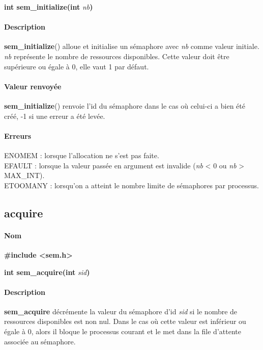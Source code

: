 \documentclass[12pt]{article}
\begin{document}
        \textbf{int sem\_initialize(int }\textit{nb}\textbf{)}
        \paragraph{Description\\}
        \textbf{sem\_initialize}() alloue et initialise un sémaphore avec \textit{nb} comme valeur initiale. \\ \textit{nb} représente le nombre de ressources disponibles. Cette valeur doit être supérieure ou égale à 0, elle vaut 1 par défaut.

        \paragraph{Valeur renvoyée\\}
        \textbf{sem\_initialize}() renvoie l'id du sémaphore dans le cas où celui-ci a bien été créé, -1 si une erreur a été levée.
        \paragraph{Erreurs\\}
        ENOMEM : lorsque l'allocation ne s'est pas faite. \\
        EFAULT : lorsque la valeur passée en argument est invalide (\textit{nb} < 0 ou \textit{nb} > MAX\_INT). \\
        ETOOMANY : lorsqu'on a atteint le nombre limite de sémaphores par processus. \\
    \newpage
    \subsection{acquire}
        \paragraph{Nom\\}
        \textbf{\#include <sem.h>}

        \textbf{int sem\_acquire(int }\textit{sid}\textbf{)}
        \paragraph{Description\\}
        \textbf{sem\_acquire} décrémente la valeur du sémaphore d'id \textit{sid} si le nombre de ressources disponibles est non nul. Dans le cas où cette valeur est inférieur ou égale à 0, alors il bloque le processus courant et le met dans la file d'attente associée au sémaphore.
\end{document}
